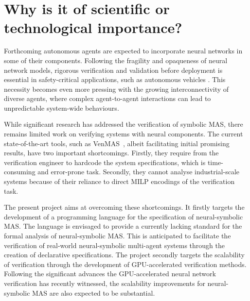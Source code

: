 \documentclass[11pt]{article}
\begin{document}
\section{Why is it of scientific or technological importance?}


Forthcoming autonomous  agents are expected to incorporate
neural networks in some of their components. Following the
fragility and opaqueness of neural network models, rigorous
verification and validation before deployment is essential
in safety-critical applications, such as autonomous
vehicles \cite{Badue+21}. This necessity becomes even more pressing with the
growing interconnectivity of diverse agents, where complex
agent-to-agent interactions can lead to unpredictable
system-wide behaviours.

While significant research has addressed the verification of
symbolic MAS, there remains limited work on
verifying systems with neural components. The current
state-of-the-art tools,  such as {\sc
VenMAS}~\cite{Akintunde+20}, albeit facilitating initial
promising results, have two important shortcomings. Firstly,
they require from the verification engineer to  hardcode the
system specifications, which is time-consuming and
error-prone task. Secondly, they cannot analyse
industrial-scale systems because of their reliance to direct
MILP encodings of the verification task. 

The present project aims at overcoming these shortcomings.
It firstly targets the development of a programming language
for the specification of neural-symbolic MAS. The language
is envisaged to provide a currently lacking standard for the
formal analysis of neural-symbolic MAS. This is anticipated
to facilitate the verification of real-world neural-symbolic
multi-agent systems through the creation of declarative
specifications. The project secondly targets the scalability
of verification through the development of GPU-accelerated
verification methods. Following the significant advances the
GPU-accelerated neural network verification has recently
witnessed, the scalability improvements for neural-symbolic
MAS are also expected to be substantial.


  
\end{document}
